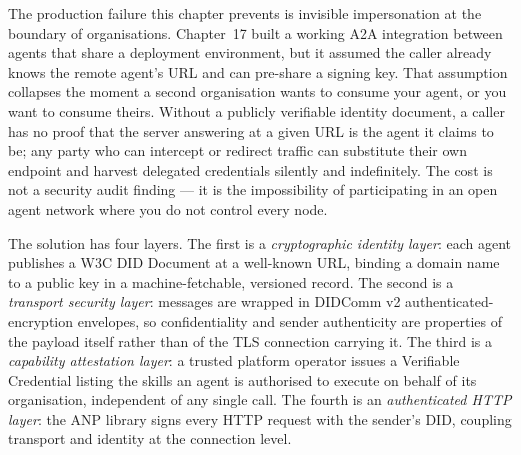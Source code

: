 

The production failure this chapter prevents is invisible impersonation at
the boundary of organisations. Chapter~17 built a working A2A integration
between agents that share a deployment environment, but it assumed the
caller already knows the remote agent's URL and can pre-share a signing
key. That assumption collapses the moment a second organisation wants to
consume your agent, or you want to consume theirs. Without a publicly
verifiable identity document, a caller has no proof that the server
answering at a given URL is the agent it claims to be; any party who can
intercept or redirect traffic can substitute their own endpoint and harvest
delegated credentials silently and indefinitely. The cost is not a security
audit finding --- it is the impossibility of participating in an open agent
network where you do not control every node.

The solution has four layers. The first is a \emph{cryptographic identity
layer}: each agent publishes a W3C DID Document at a well-known URL,
binding a domain name to a public key in a machine-fetchable, versioned
record. The second is a \emph{transport security layer}: messages are
wrapped in DIDComm v2 authenticated-encryption envelopes, so
confidentiality and sender authenticity are properties of the payload
itself rather than of the TLS connection carrying it. The third is a
\emph{capability attestation layer}: a trusted platform operator issues a
Verifiable Credential listing the skills an agent is authorised to execute
on behalf of its organisation, independent of any single call. The fourth
is an \emph{authenticated HTTP layer}: the ANP 
library signs every HTTP request with the sender's DID, coupling transport
and identity at the connection level.

